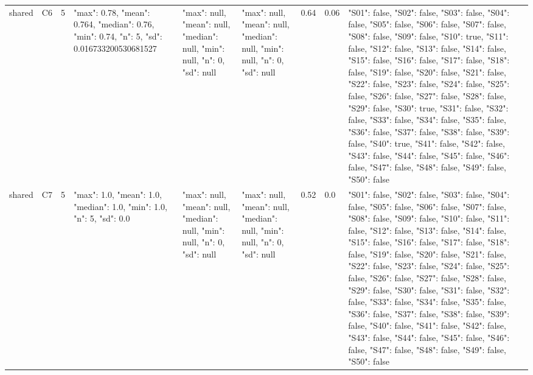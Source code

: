 \begin{tabular}{lllllllll}
shared & C6 & 5 & {"max": 0.78, "mean": 0.764, "median": 0.76, "min": 0.74, "n": 5, "sd": 0.016733200530681527} & {"max": null, "mean": null, "median": null, "min": null, "n": 0, "sd": null} & {"max": null, "mean": null, "median": null, "min": null, "n": 0, "sd": null} & 0.64 & 0.06 & {"S01": false, "S02": false, "S03": false, "S04": false, "S05": false, "S06": false, "S07": false, "S08": false, "S09": false, "S10": true, "S11": false, "S12": false, "S13": false, "S14": false, "S15": false, "S16": false, "S17": false, "S18": false, "S19": false, "S20": false, "S21": false, "S22": false, "S23": false, "S24": false, "S25": false, "S26": false, "S27": false, "S28": false, "S29": false, "S30": true, "S31": false, "S32": false, "S33": false, "S34": false, "S35": false, "S36": false, "S37": false, "S38": false, "S39": false, "S40": true, "S41": false, "S42": false, "S43": false, "S44": false, "S45": false, "S46": false, "S47": false, "S48": false, "S49": false, "S50": false} \\
shared & C7 & 5 & {"max": 1.0, "mean": 1.0, "median": 1.0, "min": 1.0, "n": 5, "sd": 0.0} & {"max": null, "mean": null, "median": null, "min": null, "n": 0, "sd": null} & {"max": null, "mean": null, "median": null, "min": null, "n": 0, "sd": null} & 0.52 & 0.0 & {"S01": false, "S02": false, "S03": false, "S04": false, "S05": false, "S06": false, "S07": false, "S08": false, "S09": false, "S10": false, "S11": false, "S12": false, "S13": false, "S14": false, "S15": false, "S16": false, "S17": false, "S18": false, "S19": false, "S20": false, "S21": false, "S22": false, "S23": false, "S24": false, "S25": false, "S26": false, "S27": false, "S28": false, "S29": false, "S30": false, "S31": false, "S32": false, "S33": false, "S34": false, "S35": false, "S36": false, "S37": false, "S38": false, "S39": false, "S40": false, "S41": false, "S42": false, "S43": false, "S44": false, "S45": false, "S46": false, "S47": false, "S48": false, "S49": false, "S50": false} \\
\end{tabular}